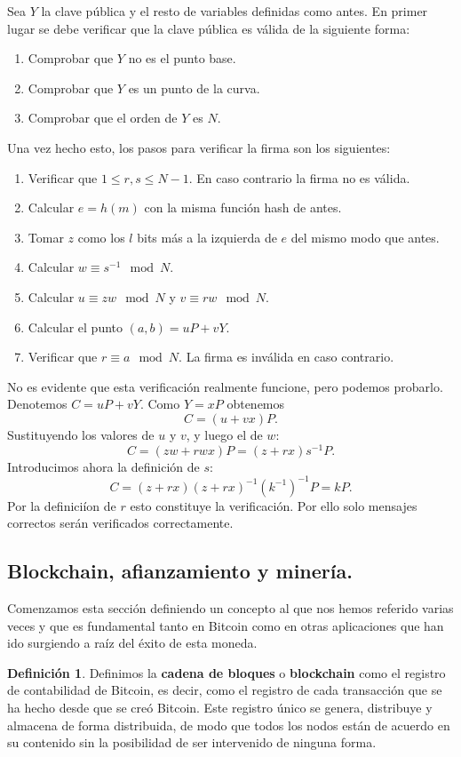 \documentclass[twoside]{article}
\theoremstyle{definition}
\newtheorem{defi}[teorema]{Definición}
\begin{document}
Sea $Y$ la clave pública y el resto de variables definidas como antes. En primer lugar se debe verificar que la clave pública es válida de la siguiente forma:
\begin{enumerate}
\item Comprobar que $Y$ no es el punto base.
\item Comprobar que $Y$ es un punto de la curva.
\item Comprobar que el orden de $Y$ es $N$.
\end{enumerate}
Una vez hecho esto, los pasos para verificar la firma son los siguientes: 
\begin{enumerate}
\item Verificar que $1\leq r,s\leq N-1$. En caso contrario la firma no es válida.
\item Calcular $e=h(m)$ con la misma función hash de antes.
\item Tomar $z$ como los $l$ bits más a la izquierda de $e$ del mismo modo que antes.
\item Calcular $w\equiv s^{-1}\mod N$.
\item Calcular $u\equiv zw\mod N$ y $v\equiv rw\mod N$. 
\item Calcular el punto $(a,b)=uP+vY$.
\item Verificar que $r\equiv a\mod N$. La firma es inválida en caso contrario.
\end{enumerate}

No es evidente que esta verificación realmente funcione, pero podemos probarlo. Denotemos $C=uP+vY$. Como $Y=xP$ obtenemos $$C=(u+vx)P.$$ Sustituyendo los valores de $u$ y $v$, y luego el de $w$: $$ C=(zw+rwx)P= (z+rx)s^{-1}P.$$ Introducimos ahora la definición de $s$: $$C=(z+rx)(z+rx)^{-1}(k^{-1})^{-1}P=kP.$$ Por la definiciíon de $r$ esto constituye la verificación. Por ello solo mensajes correctos serán verificados correctamente. 
\subsection{Blockchain, afianzamiento y minería.}

Comenzamos esta sección definiendo un concepto al que nos hemos referido varias veces y que es fundamental tanto en Bitcoin como en otras aplicaciones que han ido surgiendo a raíz del éxito de esta moneda. 
\begin{defi}
Definimos la \textbf{cadena de bloques} o \textbf{blockchain} como el registro de contabilidad de Bitcoin, es decir, como el registro de cada transacción que se ha hecho desde que se creó Bitcoin. Este registro único se genera, distribuye y almacena de forma distribuida, de modo que todos los nodos están de acuerdo en su contenido sin la posibilidad de ser intervenido de ninguna forma. 
\end{defi}
\end{document}
